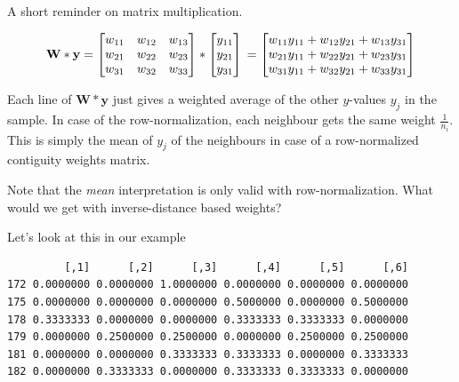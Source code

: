 \documentclass[
  letterpaper,
]{scrbook}
\newenvironment{Shaded}{\begin{snugshade}}{\end{snugshade}}
\newcommand{\NormalTok}[1]{\textcolor[rgb]{0.00,0.23,0.31}{#1}}
\newcommand{\OtherTok}[1]{\textcolor[rgb]{0.00,0.23,0.31}{#1}}
\newcommand{\SpecialCharTok}[1]{\textcolor[rgb]{0.37,0.37,0.37}{#1}}
\begin{document}
A short reminder on matrix multiplication.

\[
\boldsymbol{\mathbf{W}} * \boldsymbol{\mathbf{y}} =
\begin{bmatrix}
w_{11} & w_{12} & w_{13}\\
w_{21} & w_{22} & w_{23}\\
w_{31} & w_{32} & w_{33} 
\end{bmatrix} *
\begin{bmatrix}
y_{11} \\
y_{21} \\
y_{31}  
\end{bmatrix}\\
= \begin{bmatrix}
w_{11}y_{11} + w_{12}y_{21} + w_{13}y_{31}\\
w_{21}y_{11} + w_{22}y_{21} + w_{23}y_{31}\\
w_{31}y_{11} + w_{32}y_{21} + w_{33}y_{31}  
\end{bmatrix}
\]

Each line of \(\boldsymbol{\mathbf{W}} * \boldsymbol{\mathbf{y}}\) just
gives a weighted average of the other \(y\)-values \(y_j\) in the
sample. In case of the row-normalization, each neighbour gets the same
weight \(\frac{1}{n_i}\). This is simply the mean of \(y_j\) of the
neighbours in case of a row-normalized contiguity weights matrix.

Note that the \emph{mean} interpretation is only valid with
row-normalization. What would we get with inverse-distance based
weights?

Let's look at this in our example

\begin{Shaded}
\end{Shaded}

\begin{verbatim}
         [,1]      [,2]      [,3]      [,4]      [,5]      [,6]
172 0.0000000 0.0000000 1.0000000 0.0000000 0.0000000 0.0000000
175 0.0000000 0.0000000 0.0000000 0.5000000 0.0000000 0.5000000
178 0.3333333 0.0000000 0.0000000 0.3333333 0.3333333 0.0000000
179 0.0000000 0.2500000 0.2500000 0.0000000 0.2500000 0.2500000
181 0.0000000 0.0000000 0.3333333 0.3333333 0.0000000 0.3333333
182 0.0000000 0.3333333 0.0000000 0.3333333 0.3333333 0.0000000
\end{verbatim}
\end{document}
